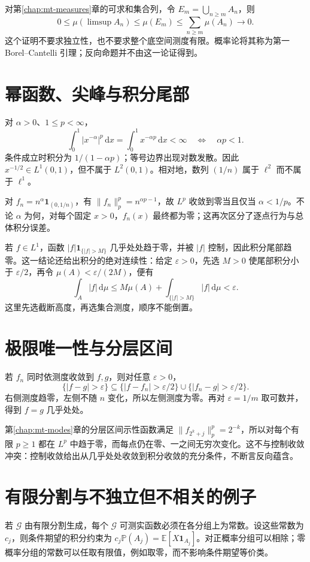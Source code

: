 \documentclass[UTF8,12pt,a4paper,fontset=fandol]{ctexbook}
\begin{document}
对第\ref{chap:mt-measures}章的可求和集合列，令 $E_m=\bigcup_{n\geq m}A_n$，则
\[
 0\leq\mu(\limsup A_n)\leq\mu(E_m)
 \leq\sum_{n\geq m}\mu(A_n)\longrightarrow0.
\]
这个证明不要求独立性，也不要求整个底空间测度有限。概率论将其称为第一 Borel--Cantelli 引理；反向命题并不由这一论证得到。

\section{幂函数、尖峰与积分尾部}
对 $\alpha>0$、$1\leq p<\infty$，
\[
 \int_0^1|x^{-\alpha}|^p\,\mathrm dx
 =\int_0^1x^{-\alpha p}\,\mathrm dx<\infty
 \quad\Longleftrightarrow\quad \alpha p<1.
\]
条件成立时积分为 $1/(1-\alpha p)$；等号边界出现对数发散。因此 $x^{-1/2}\in L^1(0,1)$，但不属于 $L^2(0,1)$。相对地，数列 $(1/n)$ 属于 $\ell^2$ 而不属于 $\ell^1$。

对 $f_n=n^\alpha\mathbf1_{(0,1/n)}$，有
$\|f_n\|_p^p=n^{\alpha p-1}$，故 $L^p$ 收敛到零当且仅当 $\alpha<1/p$。不论 $\alpha$ 为何，对每个固定 $x>0$，$f_n(x)$ 最终都为零；这再次区分了逐点行为与总体积分误差。

若 $f\in L^1$，函数 $|f|\mathbf1_{\{|f|>M\}}$ 几乎处处趋于零，并被 $|f|$ 控制，因此积分尾部趋零。这一结论还给出积分的绝对连续性：给定 $\varepsilon>0$，先选 $M>0$ 使尾部积分小于 $\varepsilon/2$，再令 $\mu(A)<\varepsilon/(2M)$，便有
\[
 \int_A|f|\,\mathrm d\mu
 \leq M\mu(A)+\int_{\{|f|>M\}}|f|\,\mathrm d\mu<\varepsilon.
\]
这里先选截断高度，再选集合测度，顺序不能倒置。

\section{极限唯一性与分层区间}
若 $f_n$ 同时依测度收敛到 $f,g$，则对任意 $\varepsilon>0$，
\[
 \{|f-g|>\varepsilon\}
 \subseteq\{|f-f_n|>\varepsilon/2\}\cup\{|f_n-g|>\varepsilon/2\}.
\]
右侧测度趋零，左侧不随 $n$ 变化，所以左侧测度为零。再对 $\varepsilon=1/m$ 取可数并，得到 $f=g$ 几乎处处。

第\ref{chap:mt-modes}章的分层区间示性函数满足 $\|f_{2^k+j}\|_p^p=2^{-k}$，所以对每个有限 $p\geq1$ 都在 $L^p$ 中趋于零，而每点仍在零、一之间无穷次变化。这不与控制收敛冲突：控制收敛给出从几乎处处收敛到积分收敛的充分条件，不断言反向蕴含。

\section{有限分割与不独立但不相关的例子}
若 $\mathcal G$ 由有限分割生成，每个 $\mathcal G$ 可测实函数必须在各分组上为常数。设这些常数为 $c_j$，则条件期望的积分约束为
$c_j\mathbb P(A_j)=\mathbb E[X\mathbf1_{A_j}]$。对正概率分组可以相除；零概率分组的常数可以任取有限值，例如取零，而不影响条件期望等价类。
\end{document}
